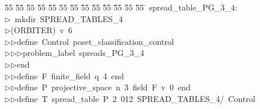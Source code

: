%
%
\begin{tabbing}
55 \= 55 \= 55 \= 55 \= 55 \= 55 \= 55 \= 55 \= 55 \= 55 \= 55 \= 55 \= 55 \= \kill
spread\_table\_PG\_3\_4:\\[0pt]
$\triangleright$\>\ mkdir\ SPREAD\_TABLES\_4\\[0pt]
$\triangleright$\>(ORBITER)\ v\ 6\ \\[0pt]
$\triangleright$\>$\triangleright$\>define\ Control\ poset\_classification\_control\ \\[0pt]
$\triangleright$\>$\triangleright$\>$\triangleright$\>problem\_label\ spreads\_PG\_3\_4\ \\[0pt]
$\triangleright$\>$\triangleright$\>end\ \\[0pt]
$\triangleright$\>$\triangleright$\>define\ F\ finite\_field\ q\ 4\ end\ \\[0pt]
$\triangleright$\>$\triangleright$\>define\ P\ projective\_space\ n\ 3\ field\ F\ v\ 0\ end\ \\[0pt]
$\triangleright$\>$\triangleright$\>define\ T\ spread\_table\ P\ 2\ 012\ SPREAD\_TABLES\_4/\ Control\ \\[0pt]
\end{tabbing}
